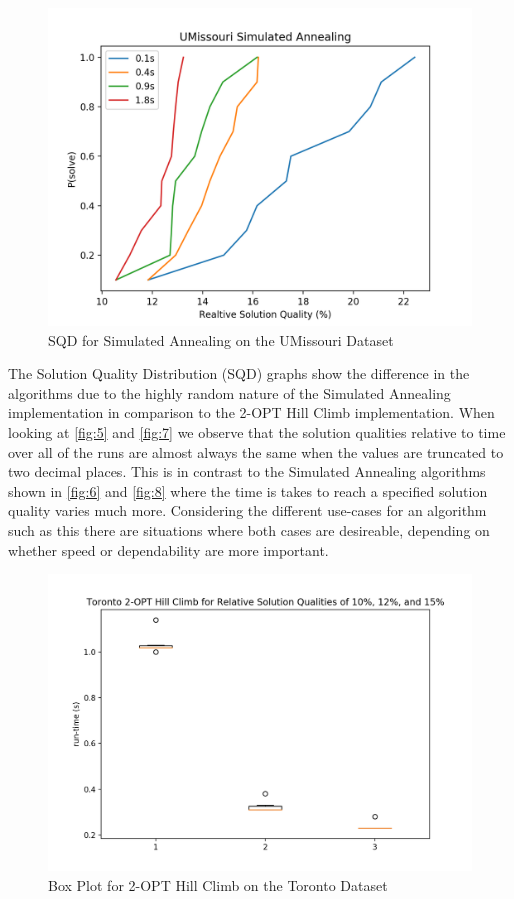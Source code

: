 \documentclass[format=sigconf]{acmart}
\begin{document}
\begin{figure}[htbp]
    \centerline{\includegraphics[scale=.5]{graphs/UMissouri_LS2_SQD.png}}
    \caption{SQD for Simulated Annealing on the UMissouri Dataset}
    \label{fig:8}
\end{figure}
The Solution Quality Distribution (SQD) graphs show the difference in the algorithms due to the 
highly random nature of the Simulated Annealing implementation in comparison to the 2-OPT Hill Climb 
implementation. When looking at \autoref{fig:5} and \autoref{fig:7} we observe that the solution qualities relative to time over all of 
the runs are almost always the same when the values are truncated to two decimal places. This is in contrast to the 
Simulated Annealing algorithms shown in \autoref{fig:6} and \autoref{fig:8} where the time is takes to reach a specified solution quality 
varies much more. Considering the different use-cases for an algorithm such as this there are situations where both cases are desireable, 
depending on whether speed or dependability are more important.
\begin{figure}[htbp]
    \centerline{\includegraphics[scale=.5]{graphs/Toronto_LS1_Box.png}}
    \caption{Box Plot for 2-OPT Hill Climb on the Toronto Dataset}
    \label{fig:9}
\end{figure}
\end{document}
